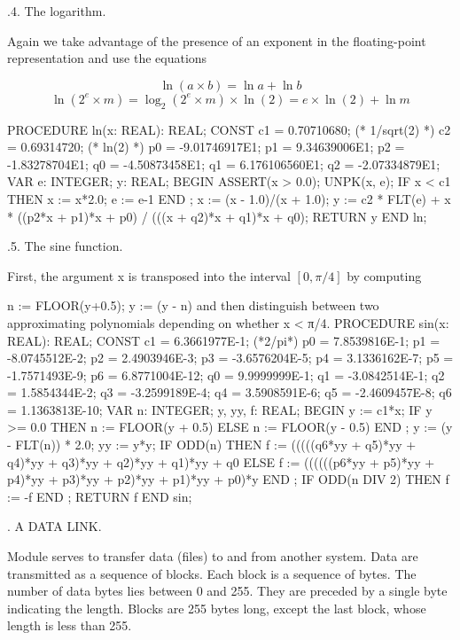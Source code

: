 .4. The logarithm.

Again we take advantage of the presence of an exponent in the floating-point representation and use the equations

$$\ln{(a \times b)} = \ln{a} + \ln{b}$$
$$\ln{(2^e \times m)} = \log_2{(2^e \times m)} \times \ln{(2)} = e \times \ln{(2)} + \ln{m}$$

\begintt
PROCEDURE ln(x: REAL): REAL;
  CONST c1 = 0.70710680; (* 1/sqrt(2) *)
        c2 = 0.69314720; (* ln(2) *)
        p0 = -9.01746917E1;
        p1 = 9.34639006E1;
        p2 = -1.83278704E1;
        q0 = -4.50873458E1;
        q1 = 6.176106560E1;
        q2 = -2.07334879E1;
  VAR e: INTEGER; y: REAL;
BEGIN
  ASSERT(x > 0.0);
  UNPK(x, e);
  IF x < c1 THEN x := x*2.0; e := e-1 END ;
  x := (x - 1.0)/(x + 1.0);
  y := c2 * FLT(e) + x * ((p2*x + p1)*x + p0) / (((x + q2)*x + q1)*x + q0);
  RETURN y
END ln;
\endtt

.5. The sine function.


First, the argument x is transposed into the interval $[0, \pi/4]$ by computing

n := FLOOR(y+0.5); y := (y - n)
and then distinguish between two approximating polynomials depending on whether x < π/4.
PROCEDURE sin(x: REAL): REAL; CONST c1 = 6.3661977E-1; (*2/pi*)
p0 = 7.8539816E-1; p1 = -8.0745512E-2; p2 = 2.4903946E-3; p3 = -3.6576204E-5; p4 = 3.1336162E-7; p5 = -1.7571493E-9; p6 = 6.8771004E-12; q0 = 9.9999999E-1; q1 = -3.0842514E-1; q2 = 1.5854344E-2; q3 = -3.2599189E-4; q4 = 3.5908591E-6; q5 = -2.4609457E-8; q6 = 1.1363813E-10;
VAR n: INTEGER; y, yy, f: REAL; BEGIN y := c1*x;
IF y >= 0.0 THEN n := FLOOR(y + 0.5) ELSE n := FLOOR(y - 0.5) END ;
y := (y - FLT(n)) * 2.0; yy := y*y;
IF ODD(n) THEN f := (((((q6*yy + q5)*yy + q4)*yy + q3)*yy + q2)*yy + q1)*yy + q0 ELSE f := ((((((p6*yy + p5)*yy + p4)*yy + p3)*yy + p2)*yy + p1)*yy + p0)*y
END ;
IF ODD(n DIV 2) THEN f := -f END ;
RETURN f
END sin;

. A DATA LINK.

Module  serves to transfer data (files) to and from another system. Data are transmitted as a sequence of blocks. Each block is a sequence of bytes. The number of data bytes lies between 0 and 255. They are preceded by a single byte indicating the length. Blocks are 255 bytes long, except the last block, whose length is less than 255.

